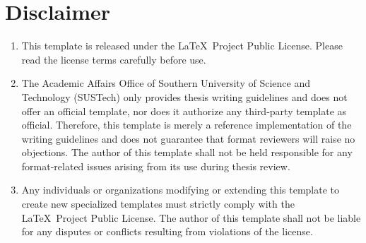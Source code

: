 \section{Disclaimer}
\begin{enumerate}[label={\alph*)}]
    \item This template is released under the \LaTeX\ Project Public License. Please read the license terms carefully before use.
    \item The Academic Affairs Office of Southern University of Science and Technology (SUSTech) only provides thesis writing guidelines and does not offer an official template, nor does it authorize any third-party template as official. Therefore, this template is merely a reference implementation of the writing guidelines and does not guarantee that format reviewers will raise no objections. The author of this template shall not be held responsible for any format-related issues arising from its use during thesis review.
    \item Any individuals or organizations modifying or extending this template to create new specialized templates must strictly comply with the \LaTeX\ Project Public License. The author of this template shall not be liable for any disputes or conflicts resulting from violations of the license.
\end{enumerate}